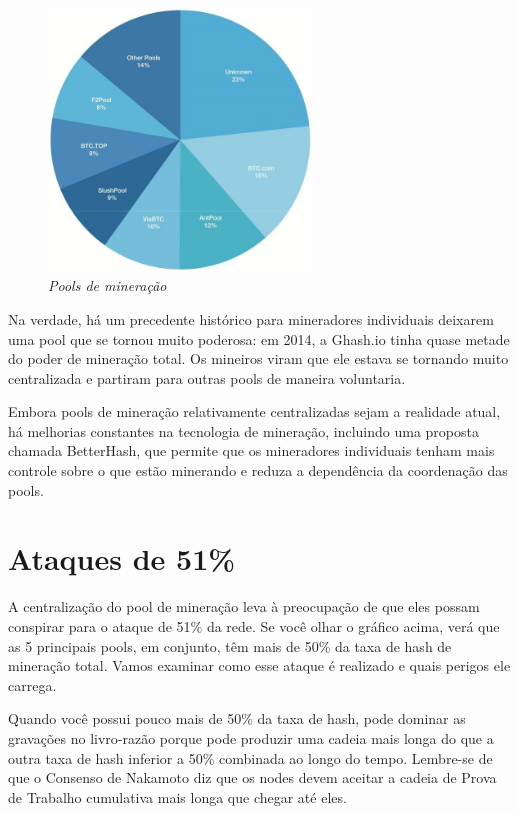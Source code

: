 \begin{figure}
  \centering
  \includegraphics[width=7cm]{imagens/capitulo-9-pizza.jpg}
  \caption*{\textit{\small Pools de mineração}}
\end{figure}

Na verdade, há um precedente histórico para mineradores individuais deixarem uma pool que se tornou muito poderosa: em 2014, a Ghash.io tinha quase metade do poder de mineração total. 
Os mineiros viram que ele estava se tornando muito centralizada e partiram para outras pools de maneira voluntaria.

Embora pools de mineração relativamente centralizadas sejam a realidade atual, há melhorias constantes na tecnologia de mineração, incluindo uma proposta chamada BetterHash, que permite que os mineradores individuais tenham mais controle sobre o que estão minerando e reduza a dependência da coordenação das pools.



\section*{Ataques de 51\%}

A centralização do pool de mineração leva à preocupação de que eles possam conspirar para o ataque de 51\% da rede.
Se você olhar o gráfico acima, verá que as 5 principais pools, em conjunto, têm mais de 50\% da taxa de hash de mineração total.
Vamos examinar como esse ataque é realizado e quais perigos ele carrega.

Quando você possui pouco mais de 50\% da taxa de hash, pode dominar as gravações no livro-razão porque pode produzir uma cadeia mais longa do que a outra taxa de hash inferior a 50\% combinada ao longo do tempo.
Lembre-se de que o Consenso de Nakamoto diz que os nodes devem aceitar a cadeia de Prova de Trabalho cumulativa mais longa que chegar até eles.


